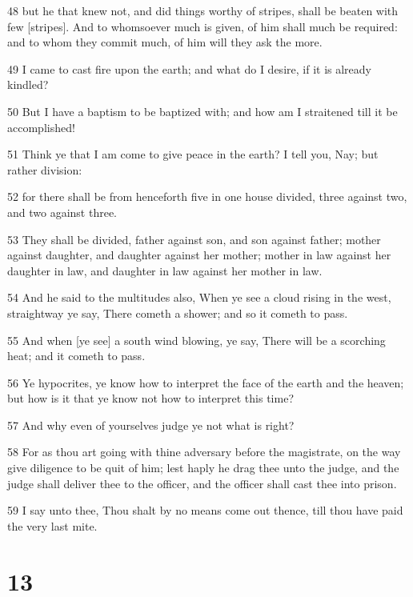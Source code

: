 \par 48 but he that knew not, and did things worthy of stripes, shall be beaten with few [stripes]. And to whomsoever much is given, of him shall much be required: and to whom they commit much, of him will they ask the more.
\par 49 I came to cast fire upon the earth; and what do I desire, if it is already kindled?
\par 50 But I have a baptism to be baptized with; and how am I straitened till it be accomplished!
\par 51 Think ye that I am come to give peace in the earth? I tell you, Nay; but rather division:
\par 52 for there shall be from henceforth five in one house divided, three against two, and two against three.
\par 53 They shall be divided, father against son, and son against father; mother against daughter, and daughter against her mother; mother in law against her daughter in law, and daughter in law against her mother in law.
\par 54 And he said to the multitudes also, When ye see a cloud rising in the west, straightway ye say, There cometh a shower; and so it cometh to pass.
\par 55 And when [ye see] a south wind blowing, ye say, There will be a scorching heat; and it cometh to pass.
\par 56 Ye hypocrites, ye know how to interpret the face of the earth and the heaven; but how is it that ye know not how to interpret this time?
\par 57 And why even of yourselves judge ye not what is right?
\par 58 For as thou art going with thine adversary before the magistrate, on the way give diligence to be quit of him; lest haply he drag thee unto the judge, and the judge shall deliver thee to the officer, and the officer shall cast thee into prison.
\par 59 I say unto thee, Thou shalt by no means come out thence, till thou have paid the very last mite.

\chapter{13}

